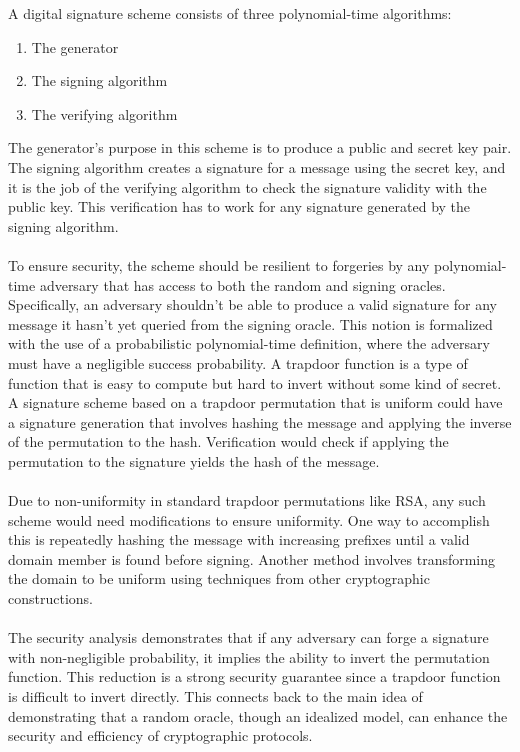 \documentclass{article}
\begin{document}
A digital signature scheme consists of three polynomial-time algorithms: 
\begin{enumerate}
    \item The generator
    \item The signing algorithm
    \item The verifying algorithm
\end{enumerate}
The generator's purpose in this scheme is to produce a public and secret key pair. The signing algorithm creates a signature for a message using the secret key, and it is the job of the verifying algorithm to check the signature validity with the public key. This verification has to work for any signature generated by the signing algorithm. 
\\\\
To ensure security, the scheme should be resilient to forgeries by any polynomial-time adversary that has access to both the random and signing oracles. Specifically, an adversary shouldn't be able to produce a valid signature for any message it hasn't yet queried from the signing oracle. This notion is formalized with the use of a probabilistic polynomial-time definition, where the adversary must have a negligible success probability. A trapdoor function is a type of function that is easy to compute but hard to invert without some kind of secret. A signature scheme based on a trapdoor permutation that is uniform could have a signature generation that involves hashing the message and applying the inverse of the permutation to the hash. Verification would check if applying the permutation to the signature yields the hash of the message.
\\\\
Due to non-uniformity in standard trapdoor permutations like RSA, any such scheme would need modifications to ensure uniformity. One way to accomplish this is repeatedly hashing the message with increasing prefixes until a valid domain member is found before signing. Another method involves transforming the domain to be uniform using techniques from other cryptographic constructions.
\\\\
The security analysis demonstrates that if any adversary can forge a signature with non-negligible probability, it implies the ability to invert the permutation function. This reduction is a strong security guarantee since a trapdoor function is difficult to invert directly. This connects back to the main idea of demonstrating that a random oracle, though an idealized model, can enhance the security and efficiency of cryptographic protocols.
\end{document}
